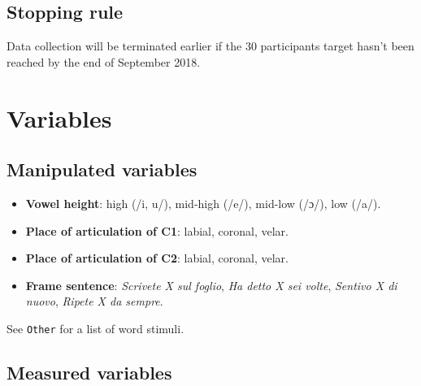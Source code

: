 \documentclass[11pt,]{article}
\providecommand{\tightlist}{%
  \setlength{\itemsep}{0pt}\setlength{\parskip}{0pt}}
\begin{document}
\hypertarget{stopping-rule}{%
\subsection{Stopping rule}\label{stopping-rule}}

Data collection will be terminated earlier if the 30 participants target
hasn't been reached by the end of September 2018.

\hypertarget{variables}{%
\section{Variables}\label{variables}}

\hypertarget{manipulated-variables}{%
\subsection{Manipulated variables}\label{manipulated-variables}}

\begin{itemize}
\tightlist
\item
  \textbf{Vowel height}: high (/i, u/), mid-high (/e/), mid-low (/ɔ/),
  low (/a/).
\item
  \textbf{Place of articulation of C1}: labial, coronal, velar.
\item
  \textbf{Place of articulation of C2}: labial, coronal, velar.
\item
  \textbf{Frame sentence}: \emph{Scrivete X sul foglio}, \emph{Ha detto
  X sei volte}, \emph{Sentivo X di nuovo}, \emph{Ripete X da sempre}.
\end{itemize}

See \texttt{Other} for a list of word stimuli.

\hypertarget{measured-variables}{%
\subsection{Measured variables}\label{measured-variables}}
\end{document}
